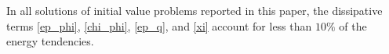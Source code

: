 \documentclass{jfm}
\begin{document}
In all solutions of initial value problems reported in this paper, the dissipative
terms \eqref{ep_phi}, \eqref{chi_phi}, \eqref{ep_q}, and \eqref{xi} account for
less than $10\%$ of the energy tendencies.



\end{document}
